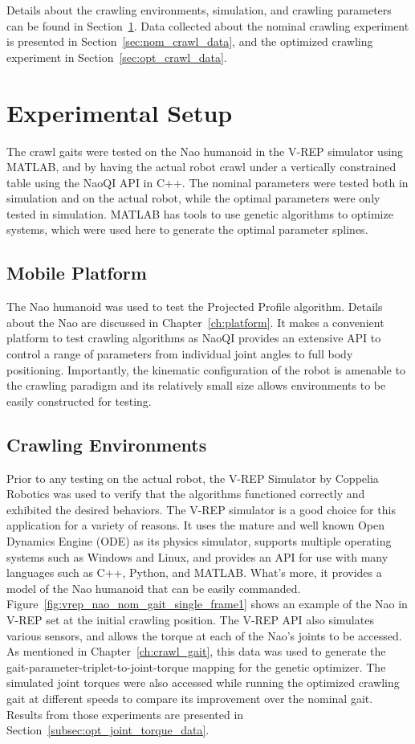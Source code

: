 Details about the crawling environments, simulation, and crawling parameters can be found in
Section~\ref{sec:crawl_exp_setup}. Data collected about the nominal crawling experiment is
presented in Section~\ref{sec:nom_crawl_data}, and the optimized crawling experiment in 
Section~\ref{sec:opt_crawl_data}.

\FloatBarrier
\section{Experimental Setup} \label{sec:crawl_exp_setup}
The crawl gaits were tested on the Nao humanoid in the V-REP simulator using MATLAB,
and by having the actual robot crawl under a vertically constrained table using the NaoQI API in C++.
The nominal parameters were tested both in simulation and on the actual robot, while
the optimal parameters were only tested in simulation. MATLAB has tools to use genetic
algorithms to optimize systems, which were used here to generate the optimal parameter
splines.

\subsection{Mobile Platform}
The Nao humanoid was used to test the Projected Profile algorithm.
Details about the Nao are discussed in Chapter~\ref{ch:platform}. It makes
a convenient platform to test crawling algorithms as NaoQI provides an extensive
API to control a range of parameters from individual joint angles to 
full body positioning. Importantly, the kinematic configuration of the robot is amenable 
to the crawling paradigm and its relatively small size allows environments to be
easily constructed for testing.

\subsection{Crawling Environments} \label{subsec:crawl_environments}
Prior to any testing on the actual robot, the V-REP Simulator by Coppelia Robotics was used
to verify that the algorithms functioned correctly and exhibited the desired behaviors.
The V-REP simulator is a good choice for this application for a variety of reasons.
It uses the mature and well known Open Dynamics Engine (ODE) as its physics simulator, supports multiple
operating systems such as Windows and Linux, and provides an API for use with many
languages such as C++, Python, and MATLAB\@. What's more, it provides a model of the Nao
humanoid that can be easily commanded.
Figure~\ref{fig:vrep_nao_nom_gait_single_frame1} shows an example of the Nao in V-REP
set at the initial crawling position.
The V-REP API also simulates various sensors, and allows the torque at each of the Nao's
joints to be accessed. As mentioned in Chapter~\ref{ch:crawl_gait}, this data was used
to generate the gait-parameter-triplet-to-joint-torque mapping for the genetic optimizer.
The simulated joint torques were also accessed while running the optimized crawling
gait at different speeds to compare its improvement over the nominal gait.
Results from those experiments are presented in Section~\ref{subsec:opt_joint_torque_data}.

